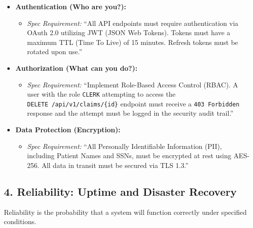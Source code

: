 \documentclass[
  11pt,
  openany,
  oneside]{book}
\providecommand{\tightlist}{%
  \setlength{\itemsep}{0pt}\setlength{\parskip}{0pt}}
\begin{document}
\begin{itemize}
\tightlist
\item
  \textbf{Authentication (Who are you?):}

  \begin{itemize}
  \tightlist
  \item
    \emph{Spec Requirement:} ``All API endpoints must require
    authentication via OAuth 2.0 utilizing JWT (JSON Web Tokens). Tokens
    must have a maximum TTL (Time To Live) of 15 minutes. Refresh tokens
    must be rotated upon use.''
  \end{itemize}
\item
  \textbf{Authorization (What can you do?):}

  \begin{itemize}
  \tightlist
  \item
    \emph{Spec Requirement:} ``Implement Role-Based Access Control
    (RBAC). A user with the role \texttt{CLERK} attempting to access the
    \texttt{DELETE\ /api/v1/claims/\{id\}} endpoint must receive a
    \texttt{403\ Forbidden} response and the attempt must be logged in
    the security audit trail.''
  \end{itemize}
\item
  \textbf{Data Protection (Encryption):}

  \begin{itemize}
  \tightlist
  \item
    \emph{Spec Requirement:} ``All Personally Identifiable Information
    (PII), including Patient Names and SSNs, must be encrypted at rest
    using AES-256. All data in transit must be secured via TLS 1.3.''
  \end{itemize}
\end{itemize}

\subsection{4. Reliability: Uptime and Disaster
Recovery}\label{reliability-uptime-and-disaster-recovery}

Reliability is the probability that a system will function correctly
under specified conditions.
\end{document}

